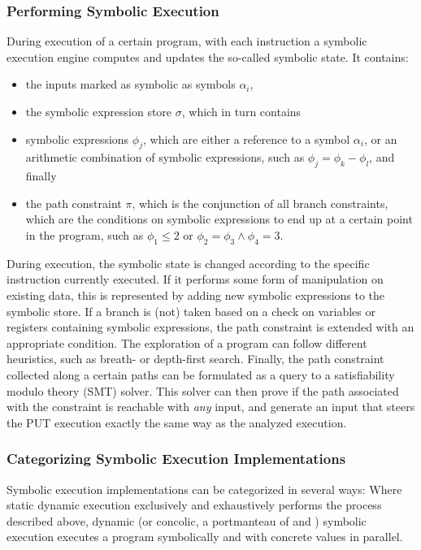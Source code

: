 \documentclass{article}
\begin{document}
\begin{multicols}{2}
  \subsubsection{Performing Symbolic Execution}
  During execution of a certain program, with each instruction a symbolic execution engine computes and updates the so-called symbolic state. It contains:
  \begin{itemize}
    \item the inputs marked as symbolic as symbols $\alpha_i$,
    \item the symbolic expression store $\sigma$, which in turn contains
    \item symbolic expressions $\phi_j$, which are either a reference to a symbol $\alpha_i$, or an arithmetic combination of symbolic expressions, such as $\phi_j=\phi_k-\phi_l$, and finally
    \item the path constraint $\pi$, which is the conjunction of all branch constraints, which are the conditions on symbolic expressions to end up at a certain point in the program, such as $\phi_1\leq2$ or $\phi_2=\phi_3\land\phi_4=3$.
  \end{itemize}

  During execution, the symbolic state is changed according to the specific instruction currently executed. If it performs some form of manipulation on existing data, this is represented by adding new symbolic expressions to the symbolic store. If a branch is (not) taken based on a check on variables or registers containing symbolic expressions, the path constraint is extended with an appropriate condition. The exploration of a program can follow different heuristics, such as breath- or depth-first search. Finally, the path constraint collected along a certain paths can be formulated as a query to a satisfiability modulo theory (SMT) solver. This solver can then prove if the path associated with the constraint is reachable with \textit{any} input, and generate an input that steers the PUT execution exactly the same way as the analyzed execution.

  \subsubsection{Categorizing Symbolic Execution Implementations}
  Symbolic execution implementations can be categorized in several ways: Where static dynamic execution exclusively and exhaustively performs the process described above, dynamic (or concolic, a portmanteau of  and ) symbolic execution executes a program symbolically and with concrete values in parallel.


\end{multicols}
\end{document}
